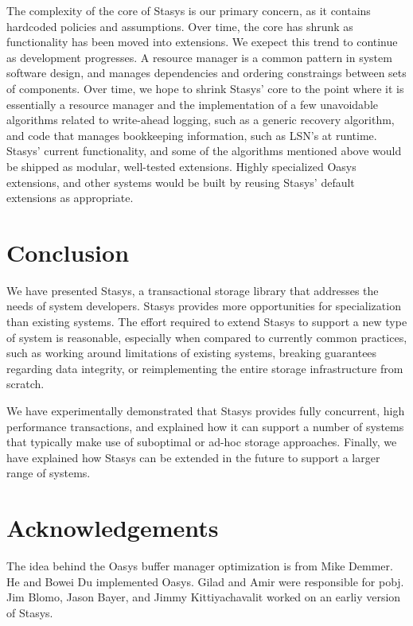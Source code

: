 \documentclass[letterpaper,twocolumn,10pt]{article}
\newcommand{\yad}{Stasys\xspace}
\newcommand{\yads}{Stasys'\xspace}
\newcommand{\oasys}{Oasys\xspace}
\begin{document}
The complexity of the core of \yad is our primary concern, as it
contains hardcoded policies and assumptions.  Over time, the core has
shrunk as functionality has been moved into extensions.  We exepect
this trend to continue as development progresses.  A resource manager
is a common pattern in system software design, and manages
dependencies and ordering constraings between sets of components.
Over time, we hope to shrink \yads core to the point where it is
essentially a resource manager and the implementation of a few unavoidable
algorithms related to write-ahead logging, such as a generic recovery
algorithm, and code that manages bookkeeping information, such as 
LSN's at runtime.  \yads current functionality, and some of the algorithms
mentioned above would be shipped as modular, well-tested extensions.
Highly specialized \oasys extensions, and other systems would be built
by reusing \yads default extensions as appropriate.


\section{Conclusion}

We have presented \yad, a transactional storage library that addresses
the needs of system developers.  \yad provides more opportunities for
specialization than existing systems.  The effort required to extend
\yad to support a new type of system is reasonable, especially when
compared to currently common practices, such as working around
limitations of existing systems, breaking guarantees regarding data
integrity, or reimplementing the entire storage infrastructure from
scratch.

We have experimentally demonstrated that \yad provides fully
concurrent, high performance transactions, and explained how it can
support a number of systems that typically make use of suboptimal or
ad-hoc storage approaches.  Finally, we have explained how \yad can be
extended in the future to support a larger range of systems.

\section{Acknowledgements}

The idea behind the \oasys buffer manager optimization is from Mike
Demmer.  He and Bowei Du implemented \oasys.  Gilad and Amir were
responsible for pobj.  Jim Blomo, Jason Bayer, and Jimmy
Kittiyachavalit worked on an earliy version of \yad.
\end{document}
